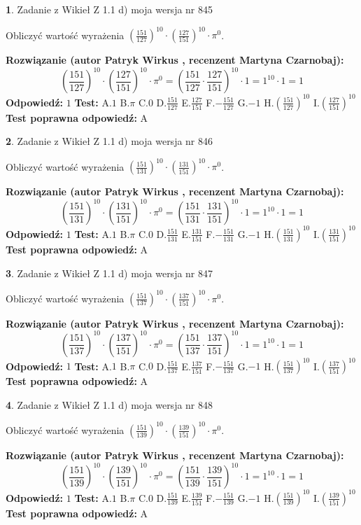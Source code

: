 \documentclass[12pt, a4paper]{article}
\theoremstyle{definition} %
\newtheorem{zad}{}
\newcommand{\zadStart}[1]{\begin{zad}#1\newline}
\newcommand{\zadStop}{\end{zad}}
\newcommand{\rozwStart}[2]{\noindent \textbf{Rozwiązanie (autor #1 , recenzent #2): }\newline}
\newcommand{\rozwStop}{\newline}
\newcommand{\odpStart}{\noindent \textbf{Odpowiedź:}\newline}
\newcommand{\odpStop}{\newline}
\newcommand{\testStart}{\noindent \textbf{Test:}\newline}
\newcommand{\testStop}{\newline}
\newcommand{\kluczStart}{\noindent \textbf{Test poprawna odpowiedź:}\newline}
\newcommand{\kluczStop}{\newline}
\begin{document}
\zadStart{Zadanie z Wikieł Z 1.1 d) moja wersja nr 845}

Obliczyć wartość wyrażenia $(\frac{151}{127})^{10} \cdot (\frac{127}{151})^{10} \cdot \pi^{0}$.
\zadStop
\rozwStart{Patryk Wirkus}{Martyna Czarnobaj}
$$(\frac{151}{127})^{10} \cdot (\frac{127}{151})^{10} \cdot \pi^{0} = (\frac{151}{127} \cdot \frac{127}{151})^{10} \cdot 1 = 1^{10} \cdot 1 = 1$$
\rozwStop
\odpStart
$1$
\odpStop
\testStart
A.$1$ B.$\pi$ C.$0$ D.$\frac{151}{127}$ E.$\frac{127}{151}$
F.$-\frac{151}{127}$ G.$-1$
H.$(\frac{151}{127})^{10}$
I.$(\frac{127}{151})^{10}$
\testStop
\kluczStart
A
\kluczStop



\zadStart{Zadanie z Wikieł Z 1.1 d) moja wersja nr 846}

Obliczyć wartość wyrażenia $(\frac{151}{131})^{10} \cdot (\frac{131}{151})^{10} \cdot \pi^{0}$.
\zadStop
\rozwStart{Patryk Wirkus}{Martyna Czarnobaj}
$$(\frac{151}{131})^{10} \cdot (\frac{131}{151})^{10} \cdot \pi^{0} = (\frac{151}{131} \cdot \frac{131}{151})^{10} \cdot 1 = 1^{10} \cdot 1 = 1$$
\rozwStop
\odpStart
$1$
\odpStop
\testStart
A.$1$ B.$\pi$ C.$0$ D.$\frac{151}{131}$ E.$\frac{131}{151}$
F.$-\frac{151}{131}$ G.$-1$
H.$(\frac{151}{131})^{10}$
I.$(\frac{131}{151})^{10}$
\testStop
\kluczStart
A
\kluczStop



\zadStart{Zadanie z Wikieł Z 1.1 d) moja wersja nr 847}

Obliczyć wartość wyrażenia $(\frac{151}{137})^{10} \cdot (\frac{137}{151})^{10} \cdot \pi^{0}$.
\zadStop
\rozwStart{Patryk Wirkus}{Martyna Czarnobaj}
$$(\frac{151}{137})^{10} \cdot (\frac{137}{151})^{10} \cdot \pi^{0} = (\frac{151}{137} \cdot \frac{137}{151})^{10} \cdot 1 = 1^{10} \cdot 1 = 1$$
\rozwStop
\odpStart
$1$
\odpStop
\testStart
A.$1$ B.$\pi$ C.$0$ D.$\frac{151}{137}$ E.$\frac{137}{151}$
F.$-\frac{151}{137}$ G.$-1$
H.$(\frac{151}{137})^{10}$
I.$(\frac{137}{151})^{10}$
\testStop
\kluczStart
A
\kluczStop



\zadStart{Zadanie z Wikieł Z 1.1 d) moja wersja nr 848}

Obliczyć wartość wyrażenia $(\frac{151}{139})^{10} \cdot (\frac{139}{151})^{10} \cdot \pi^{0}$.
\zadStop
\rozwStart{Patryk Wirkus}{Martyna Czarnobaj}
$$(\frac{151}{139})^{10} \cdot (\frac{139}{151})^{10} \cdot \pi^{0} = (\frac{151}{139} \cdot \frac{139}{151})^{10} \cdot 1 = 1^{10} \cdot 1 = 1$$
\rozwStop
\odpStart
$1$
\odpStop
\testStart
A.$1$ B.$\pi$ C.$0$ D.$\frac{151}{139}$ E.$\frac{139}{151}$
F.$-\frac{151}{139}$ G.$-1$
H.$(\frac{151}{139})^{10}$
I.$(\frac{139}{151})^{10}$
\testStop
\kluczStart
A
\kluczStop
\end{document}
